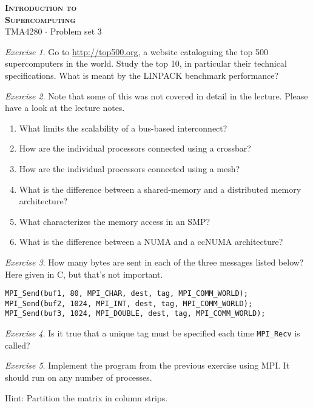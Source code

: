 \documentclass[onecolumn, oneside, a4paper, 11pt]{memoir}
\theoremstyle{remark}
\newtheorem{ex}{Exercise}
\begin{document}
\pagestyle{empty}

\begin{center}
  {\Huge \bfseries \scshape
    Introduction to \\[0.2\baselineskip] Supercomputing} \\[2\baselineskip]
  {\Large TMA4280 $\cdot$ Problem set 3} \\[2\baselineskip]
\end{center}

\begin{ex}
  Go to \url{http://top500.org}, a website cataloguing the top 500
  supercomputers in the world. Study the top 10, in particular their technical
  specifications. What is meant by the LINPACK benchmark performance?
\end{ex}

\begin{ex}
  Note that some of this was not covered in detail in the lecture. Please have a
  look at the lecture notes.
  \begin{enumerate}
  \item What limits the scalability of a bus-based interconnect?
  \item How are the individual processors connected using a crossbar?
  \item How are the individual processors connected using a mesh?
  \item What is the difference between a shared-memory and a distributed
    memory architecture?
  \item What characterizes the memory access in an SMP?
  \item What is the difference between a NUMA and a ccNUMA architecture?
  \end{enumerate}
\end{ex}

\begin{ex}
  How many bytes are sent in each of the three messages listed below? Here given
  in C, but that's not important.

\begin{lstlisting}[style=c]
MPI_Send(buf1, 80, MPI_CHAR, dest, tag, MPI_COMM_WORLD);
MPI_Send(buf2, 1024, MPI_INT, dest, tag, MPI_COMM_WORLD);
MPI_Send(buf3, 1024, MPI_DOUBLE, dest, tag, MPI_COMM_WORLD);
\end{lstlisting}
\end{ex}

\begin{ex}
  Is it true that a unique tag must be specified each time \texttt{MPI\_Recv} is
  called?
\end{ex}

\begin{ex}
  Implement the program from the previous exercise using MPI. It should run on
  any number of processes.

  Hint: Partition the matrix in column strips.
\end{ex}
\end{document}
